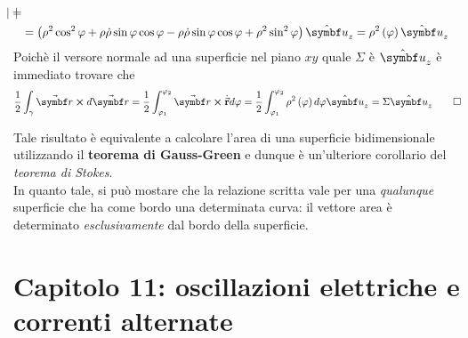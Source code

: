 \begin{demonstration}
\begin{align*}
\begin{vmatrix}
		\end{vmatrix}=\\
	&=\left(\rho^2\cos^2\phi + \rho \dot{\rho}\sin\phi\cos\phi-\rho \dot{\rho}\sin\phi\cos\phi+\rho^2\sin^2\phi\right)\vbh{u}_z=\rho^2\left(\phi\right)\vbh{u}_z
	\end{align*}
	Poichè il versore normale ad una superficie nel piano $xy$ quale $\Sigma$ è $\vbh{u}_z$ è immediato trovare che
	\begin{equation*}
		\frac{1}{2}\int_{\gamma}\vba{r}\cross d\vba{r}=\frac{1}{2}\int_{\phi_1}^{\phi_2}\vba{r}\cross\vbd{r}d\phi=\frac{1}{2}\int_{\phi_1}^{\phi_2}\rho^2\left(\phi\right)d\phi\vbh{u}_z=\Sigma\vbh{u}_z\qedhere
	\end{equation*} 
\end{demonstration}
\begin{observe} %
	Tale risultato è equivalente a calcolare l'area di una superficie bidimensionale utilizzando il \textbf{teorema di Gauss-Green} e dunque è un'ulteriore corollario del \textit{teorema di Stokes}.\\
	In quanto tale, si può mostare che la relazione scritta vale per una \textit{qualunque} superficie che ha come bordo una determinata curva: il vettore area è determinato \textit{esclusivamente} dal bordo della superficie.
\end{observe}
\section{Capitolo 11: oscillazioni elettriche e correnti alternate}
